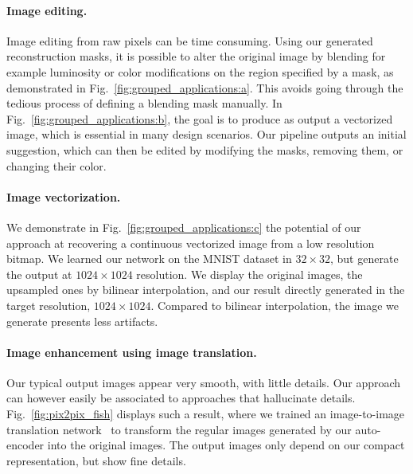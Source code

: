 \documentclass[10pt,twocolumn,letterpaper]{article}
\begin{document}
\paragraph{Image editing.}{
Image editing from raw pixels can be time consuming. Using our generated reconstruction masks, it is possible to alter the original image by blending for example luminosity or color modifications on the region specified by a mask, as demonstrated in Fig.~\ref{fig:grouped_applications:a}. This avoids going through the tedious process of defining a blending mask manually.
In Fig.~\ref{fig:grouped_applications:b}, the goal is to produce as output a vectorized image, which is essential in many design scenarios. Our pipeline outputs an initial suggestion, which can then be edited by modifying the masks, removing them, or changing their color.
}

\paragraph{Image vectorization.}

We demonstrate in Fig.~\ref{fig:grouped_applications:c} the potential of our approach at recovering a continuous vectorized image from a low resolution bitmap. We learned our network on the MNIST dataset in $32\times32$, but generate the output at $1024\times1024$ resolution. We display the original images, the upsampled ones by bilinear interpolation, and our result directly generated in the target resolution, $1024\times1024$. Compared to bilinear interpolation, the image we generate presents less artifacts.



\paragraph{Image enhancement using image translation.}

Our typical output images appear very smooth, with little details. Our approach can however easily be associated to approaches that hallucinate details. Fig.~\ref{fig:pix2pix_fish} displays such a result, where we trained an image-to-image translation network~\cite{Isola2016ImageToImage} to transform the regular images generated by our auto-encoder into the original images. The output images only depend on our compact representation, but show fine details.
\end{document}
